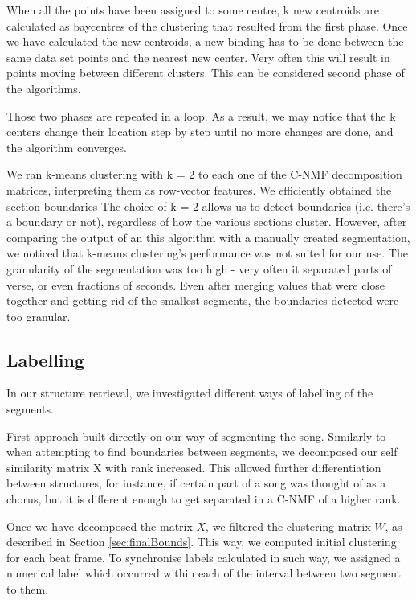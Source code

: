 When all the points have been assigned to some centre, k new centroids are calculated as baycentres of the clustering that resulted from the first phase. Once we have calculated the new centroids, a new binding has to be done  between the same data set points and the nearest new center. Very often this will result in points moving between different clusters. This can be considered second phase of the algorithms. 

Those two phases are repeated in a loop. As a result, we may notice that the k centers change their location step by step until no more changes are done, and the algorithm converges. 

We ran k-means clustering with k = 2 to each one of the C-NMF decomposition matrices, interpreting them as row-vector features. We efficiently obtained the section boundaries The choice of k = 2 allows us to detect boundaries (i.e. there’s a boundary or not), regardless of how the various sections cluster. However, after comparing the output of an this algorithm with a manually created segmentation, we noticed that k-means clustering's performance was not suited for our use. The granularity of the segmentation was too high - very often it separated parts of verse, or even fractions of seconds. Even after merging values that were close together and getting rid of the smallest segments, the boundaries detected were too granular.

\vspace{10pt}


\subsection{Labelling}

In our structure retrieval, we investigated different ways of labelling of the segments.

First approach built directly on our way of segmenting the song.
Similarly to when attempting to find boundaries between segments, we decomposed our self similarity matrix X with rank increased. This allowed further differentiation between structures, for instance, if certain part of a song was thought of as a chorus, but it is different enough to get separated in a C-NMF of a higher rank.

Once we have decomposed the matrix $X$, we filtered the clustering matrix $W$, as described in Section \ref{sec:finalBounds}. This way, we computed initial clustering for each beat frame. To synchronise labels calculated in such way, we assigned a numerical label which occurred within each of the interval between two segment to them.


